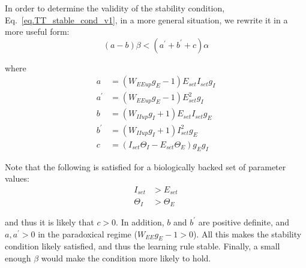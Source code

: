 \documentclass[twocolumn]{article}
\newcommand{\EE}{\mathit{EE}}
\newcommand{\II}{\mathit{II}}
\newcommand{\set}{\mathit{set}}
\newcommand{\up}{\mathit{up}}
\begin{document}
In order to determine the validity of the stability condition, Eq.\ \ref{eq.TT_stable_cond_v1}, in a more general situation, we rewrite it in a more useful form:
\begin{equation}
(a - b)\beta < (a^\prime + b^\prime + c) \alpha
\label{eq.TT_stable_cond_v2}
\end{equation}

\noindent where
\begin{displaymath}
\begin{aligned}
a & = (W_{\EE\up}g_E - 1) E_{\set} I_{\set} g_I \\
a^\prime & = (W_{\EE\up}g_E - 1)E_{\set}^2 g_I \\
b & = (W_{\II\up}g_I + 1) E_{\set} I_{\set} g_E \\
b^\prime & = (W_{\II\up}g_I + 1)I_{\set}^2 g_E \\
c & = (I_{\set}\Theta_I - E_{\set}\Theta_E)g_E g_I
\end{aligned}
\end{displaymath}

\noindent Note that the following is satisfied for a biologically backed set of parameter values:
\begin{displaymath}
\begin{aligned}
I_{\set} & > E_{\set} \\
\Theta_I & > \Theta_E
\end{aligned}
\end{displaymath}

\noindent and thus it is likely that $c>0$. In addition, $b$ and $b^\prime$ are positive definite, and $a,a^\prime>0$ in the paradoxical regime ($W_{\EE}g_E - 1 > 0$). All this makes the stability condition likely satisfied, and thus the learning rule stable. Finally, a small enough $\beta$ would make the condition more likely to hold.
\end{document}
